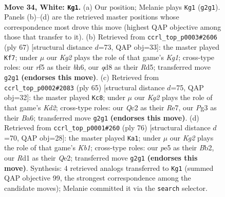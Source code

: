 \documentclass[11pt]{article}
\begin{document}
\clearpage

\begin{figure}[p]\centering
\begin{subfigure}{0.46\textwidth}\centering
\resizebox{\linewidth}{!}{%
\newchessgame
\chessboard[
  setfen={r1bq3k/8/8/4pr1p/2p4P/p1P3P1/P1QBR1K1/3R4 w - - 10 34},
  showmover=false,
  pgfstyle=straightmove, color=movearrow, markmove={g2-g1}
]}
\caption{}
\end{subfigure}\hfill
\begin{subfigure}{0.46\textwidth}\centering
\resizebox{\linewidth}{!}{%
\newchessgame
\chessboard[
  setfen={6k1/7p/p1pq3B/3r1bP1/1P1P1p2/8/P3QP2/3R2K1 b - - 0 34},
  showmover=false,
  pgfstyle=straightmove, color=movearrow, markmove={g8-f7}
]}
\caption{}
\end{subfigure}
\\[4pt]
\begin{subfigure}{0.46\textwidth}\centering
\resizebox{\linewidth}{!}{%
\newchessgame
\chessboard[
  setfen={r7/p2kr2p/bpp5/q2pBp2/3P1P2/7Q/P6P/1R2R2K b - - 1 33},
  showmover=false,
  pgfstyle=straightmove, color=movearrow, markmove={d7-c8}
]}
\caption{}
\end{subfigure}\hfill
\begin{subfigure}{0.46\textwidth}\centering
\resizebox{\linewidth}{!}{%
\newchessgame
\chessboard[
  setfen={3r4/6pk/3rq3/p3p3/1pP1P3/1P1P2P1/1B2Q3/1K1R4 w - - 1 39},
  showmover=false,
  pgfstyle=straightmove, color=movearrow, markmove={b1-a1}
]}
\caption{}
\end{subfigure}
\caption{\textbf{Move 34, White: \texttt{Kg1}.} (a) Our position; Melanie plays \texttt{Kg1} (\texttt{g2g1}). Panels (b)--(d) are the retrieved master positions whose correspondence most drove this move (highest QAP objective among those that transfer to it). (b) Retrieved from \texttt{ccrl\_top\_p0003\#2606} (ply 67) [structural distance $d$=73, QAP obj=33]: the master played \texttt{Kf7}; under $\mu$ our \emph{Kg2} plays the role of that game's \emph{Kg1}; cross-type roles: our \emph{r}f5 as their \emph{b}h6, our \emph{q}d8 as their \emph{R}d5; transferred move \texttt{g2g1} \textbf{(endorses this move)}. (c) Retrieved from \texttt{ccrl\_top\_p0002\#2083} (ply 65) [structural distance $d$=75, QAP obj=32]: the master played \texttt{Kc8}; under $\mu$ our \emph{Kg2} plays the role of that game's \emph{Kd2}; cross-type roles: our \emph{Q}c2 as their \emph{R}e7, our \emph{P}g3 as their \emph{B}a6; transferred move \texttt{g2g1} \textbf{(endorses this move)}. (d) Retrieved from \texttt{ccrl\_top\_p0001\#260} (ply 76) [structural distance $d$=70, QAP obj=28]: the master played \texttt{Ka1}; under $\mu$ our \emph{Kg2} plays the role of that game's \emph{Kb1}; cross-type roles: our \emph{p}e5 as their \emph{B}b2, our \emph{R}d1 as their \emph{Q}e2; transferred move \texttt{g2g1} \textbf{(endorses this move)}. Synthesis: 4 retrieved analogs transferred to \texttt{Kg1} (summed QAP objective 99, the strongest correspondence among the candidate moves); Melanie committed it via the \texttt{search} selector.}
\label{fig:thought-m66}
\end{figure}
\end{document}
